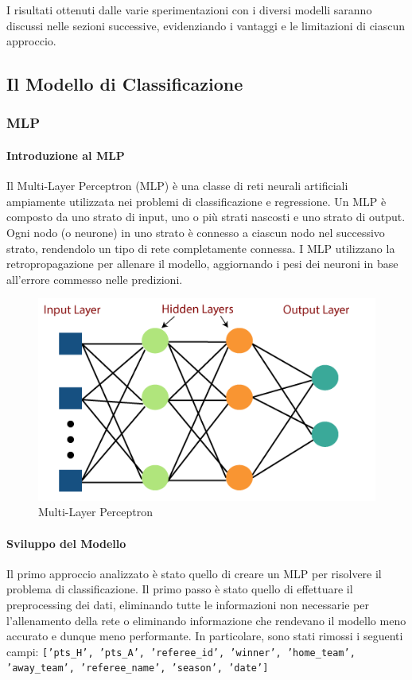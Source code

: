 I risultati ottenuti dalle varie sperimentazioni con i diversi modelli saranno discussi nelle sezioni successive, evidenziando i vantaggi e le limitazioni di ciascun approccio.

\subsection{Il Modello di Classificazione}

\subsubsection{MLP}

\paragraph{Introduzione al MLP}
Il Multi-Layer Perceptron (MLP) è una classe di reti neurali artificiali ampiamente utilizzata nei problemi di classificazione e regressione. Un MLP è composto da uno strato di input, uno o più strati nascosti e uno strato di output. Ogni nodo (o neurone) in uno strato è connesso a ciascun nodo nel successivo strato, rendendolo un tipo di rete completamente connessa. I MLP utilizzano la retropropagazione per allenare il modello, aggiornando i pesi dei neuroni in base all'errore commesso nelle predizioni.
\begin{figure}[H]
    \centering
    \includegraphics[width=0.3\linewidth]{img/multi-layer-perceptron-in-tensorflow.png}
    \caption{Multi-Layer Perceptron}
    \label{fig:enter-label}
\end{figure}

\paragraph{Sviluppo del Modello}
Il primo approccio analizzato è stato quello di creare un MLP per risolvere il problema di classificazione. Il primo passo è stato quello di effettuare il preprocessing dei dati, eliminando tutte le informazioni non necessarie per l'allenamento della rete o eliminando informazione che rendevano il modello meno accurato e dunque meno performante. In particolare, sono stati rimossi i seguenti campi: \newline
\texttt{['pts\_H', 'pts\_A', 'referee\_id', 'winner', 'home\_team', 'away\_team', 'referee\_name', \newline
'season', 'date']}

